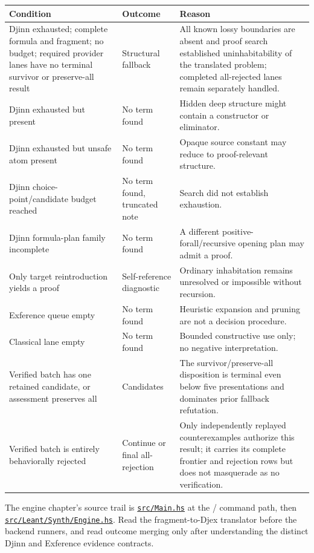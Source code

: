 \documentclass[10pt,letterpaper,oneside]{report}
\newcommand{\code}[1]{\texttt{\detokenize{#1}}}
\def\LeantBase{https://github.com/VladimirReshetnikov/Leant/blob/ada69d884480b93e74ee4b3daf77be38702ee07d/}
\newcommand{\lpath}[1]{\href{\LeantBase#1}{\nolinkurl{#1}}}
\begin{document}
\begin{longtable}{@{}L{0.35\textwidth}L{0.22\textwidth}L{0.33\textwidth}@{}}
\toprule
\textbf{Condition} & \textbf{Outcome} & \textbf{Reason} \\
\midrule
\endhead
Djinn exhausted; complete formula and fragment; no budget; required provider lanes have no terminal survivor or preserve-all result & Structural fallback & All known lossy boundaries are absent and proof search established uninhabitability of the translated problem; completed all-rejected lanes remain separately handled. \\
Djinn exhausted but \code{FDepth} present & No term found & Hidden deep structure might contain a constructor or eliminator. \\
Djinn exhausted but unsafe atom present & No term found & Opaque source constant may reduce to proof-relevant structure. \\
Djinn choice-point/candidate budget reached & No term found, truncated note & Search did not establish exhaustion. \\
Djinn formula-plan family incomplete & No term found & A different positive-forall/recursive opening plan may admit a proof. \\
Only target reintroduction yields a proof & Self-reference diagnostic & Ordinary inhabitation remains unresolved or impossible without recursion. \\
Exference queue empty & No term found & Heuristic expansion and pruning are not a decision procedure. \\
Classical lane empty & No term found & Bounded constructive use only; no negative interpretation. \\
Verified batch has one retained candidate, or assessment preserves all & Candidates & The survivor/preserve-all disposition is terminal even below five presentations and dominates prior fallback refutation. \\
Verified batch is entirely behaviorally rejected & Continue or final all-rejection & Only independently replayed counterexamples authorize this result; it carries its complete frontier and rejection rows but does not masquerade as no verification. \\
\bottomrule
\end{longtable}

\begin{sourcebox}
The engine chapter's source trail is \lpath{src/Main.hs} at the \code{:synth}/\code{:suggest} command path, then \lpath{src/Leant/Synth/Engine.hs}. Read the fragment-to-Djex translator before the backend runners, and read outcome merging only after understanding the distinct Djinn and Exference evidence contracts.
\end{sourcebox}
\end{document}
